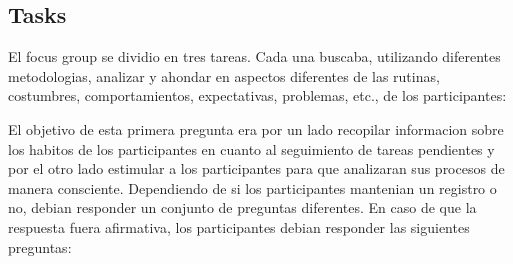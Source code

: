 
\subsection{Tasks}
El focus group se dividio en tres tareas. Cada una buscaba, utilizando diferentes metodologias, analizar y ahondar en aspectos diferentes de las rutinas, costumbres, comportamientos, expectativas, problemas, etc., de los participantes:

El objetivo de esta primera pregunta era por un lado recopilar informacion sobre los habitos de los participantes en cuanto al seguimiento de tareas pendientes y por el otro lado estimular a los participantes para que analizaran sus procesos de manera consciente. Dependiendo de si los participantes mantenian un registro o no, debian responder un conjunto de preguntas diferentes.
En caso de que la respuesta fuera afirmativa, los participantes debian responder las siguientes preguntas:

